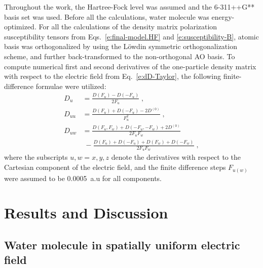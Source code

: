 \documentclass[aip,amsmath,amssymb,reprint,floatfix]{revtex4-1}
\begin{document}
%
Throughout the work, the Hartree\hyp{}Fock level\cite{Roothaan.RevModPhys.1951} was assumed 
and the 6-311++G** basis set\cite{Krishnan.Binkley.Seeger.Pople.JCP.1980}
was used. Before all the calculations, water molecule was energy\hyp{}optimized.
For all the calculations of the density matrix polarization susceptibility tensors
from Eqs.~\eqref{e:final-model.HF} and \eqref{e:susceptibility-B}, 
atomic basis was orthogonalized by using the L{\"o}wdin symmetric orthogonalization scheme,\cite{Mayer.IJQC.2002}
and further back\hyp{}transformed to the non\hyp{}orthogonal AO basis.
To compute numerical first and second derivatives of the one\hyp{}particle density matrix
with respect to the electric field from Eq.~\eqref{e:dD-Taylor}, 
the following finite\hyp{}difference formulae were utilized:
%
\begin{subequations}\label{e:ff}
  \begin{align}
    D_u    &= \frac{D(F_u) - D(-F_u)}{2F_u} \;,\\
    D_{uu} &= \frac{D(F_u) + D(-F_u) - 2D^{(0)}}{F_u^2} \;,\\
    D_{uw} &= \frac{D(F_u,F_w) + D(-F_u,-F_w) + 2D^{(0)}}{2F_uF_w} \nonumber \\ 
           & \; -\frac{D(F_u) + D(-F_u) + D(F_w) + D(-F_w)}{2F_uF_w} \;,
  \end{align}
\end{subequations}
%
where 
the subscripts $u,w=x,y,z$ denote the derivatives with respect 
to the Cartesian component of the electric field, and the finite difference
steps $F_{u(w)}$ were assumed to be 0.0005~a.u for all components. 

\section{\label{s:4}Results and Discussion}

\subsection{\label{ss:41}Water molecule in spatially uniform electric field}
\end{document}
